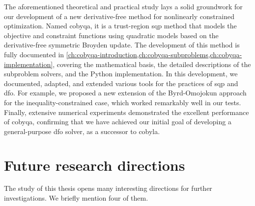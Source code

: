 The aforementioned theoretical and practical study lays a solid groundwork for our development of a new derivative-free method for nonlinearly constrained optimization.
Named \gls{cobyqa}, it is a trust-region \gls{sqp} method that models the objective and constraint functions using quadratic models based on the derivative-free symmetric Broyden update.
The development of this method is fully documented in \cref{ch:cobyqa-introduction,ch:cobyqa-subproblems,ch:cobyqa-implementation}, covering the mathematical basis, the detailed descriptions of the subproblem solvers, and the Python implementation.
In this development, we documented, adapted, and extended various tools for the practices of \gls{sqp} and \gls{dfo}.
For example, we proposed a new extension of the Byrd-Omojokun approach for the inequality-constrained case, which worked remarkably well in our tests.
Finally, extensive numerical experiments demonstrated the excellent performance of \gls{cobyqa}, confirming that we have achieved our initial goal of developing a general-purpose \gls{dfo} solver, as a successor to \gls{cobyla}.

\section{Future research directions}

The study of this thesis opens many interesting directions for further investigations.
We briefly mention four of them.

